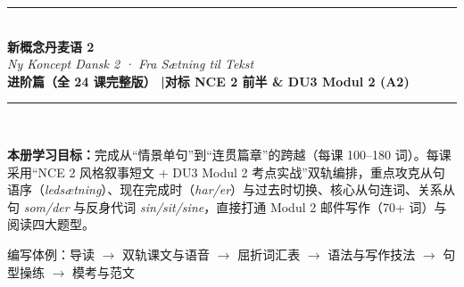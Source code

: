 \documentclass[11pt, a4paper]{ctexart}
\begin{document}
\begin{titlepage}
  \centering
  \vspace*{2.5cm}
  {\color{NCDRed}\rule{\linewidth}{2.5pt}}\\[1.2cm]
  {\fontsize{34}{40}\selectfont\bfseries\color{NCDNavy} 新概念丹麦语 2}\\[0.5cm]
  {\huge\itshape\color{NCDTeal} Ny Koncept Dansk 2 · Fra Sætning til Tekst}\\[0.8cm]
  {\large\bfseries\color{NCDGray} 进阶篇（全 24 课完整版） \quad|\quad 对标 NCE 2 前半 \& DU3 Modul 2 (A2)}\\[1.2cm]
  {\color{NCDRed}\rule{\linewidth}{2.5pt}}\\[2cm]

  \begin{tcolorbox}[
    colback=NCDBgBlue,
    colframe=NCDNavy,
    width=0.88\linewidth,
    arc=4pt,
    boxrule=0.8pt,
    left=14pt, right=14pt, top=12pt, bottom=12pt
  ]
    \textbf{\color{NCDNavy}本册学习目标：}完成从“情景单句”到“连贯篇章”的跨越（每课 100--180 词）。每课采用“NCE 2 风格叙事短文 + DU3 Modul 2 考点实战”双轨编排，重点攻克从句语序（\textit{ledsætning}）、现在完成时（\textit{har/er}）与过去时切换、核心从句连词、关系从句 \textit{som/der} 与反身代词 \textit{sin/sit/sine}，直接打通 Modul 2 邮件写作（70+ 词）与阅读四大题型。
  \end{tcolorbox}

  \vfill
  {\large\color{NCDGray} 编写体例：导读 $\rightarrow$ 双轨课文与语音 $\rightarrow$ 屈折词汇表 $\rightarrow$ 语法与写作技法 $\rightarrow$ 句型操练 $\rightarrow$ 模考与范文}
\end{titlepage}

\tableofcontents
\clearpage









\end{document}
